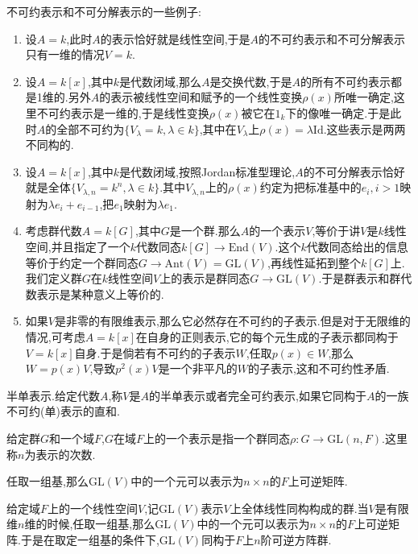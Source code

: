 不可约表示和不可分解表示的一些例子:
\begin{enumerate}
	\item 设$A=k$,此时$A$的表示恰好就是线性空间,于是$A$的不可约表示和不可分解表示只有一维的情况$V=k$.
	\item 设$A=k[x]$,其中$k$是代数闭域,那么$A$是交换代数,于是$A$的所有不可约表示都是1维的.另外$A$的表示被线性空间和赋予的一个线性变换$\rho(x)$所唯一确定,这里不可约表示是一维的,于是线性变换$\rho(x)$被它在$1_k$下的像唯一确定.于是此时$A$的全部不可约为$\{V_{\lambda}=k,\lambda\in k\}$,其中在$V_{\lambda}$上$\rho(x)=\lambda\mathrm{Id}$.这些表示是两两不同构的.
	\item 设$A=k[x]$,其中$k$是代数闭域,按照Jordan标准型理论,$A$的不可分解表示恰好就是全体$\{V_{\lambda,n}=k^n,\lambda\in k\}$.其中$V_{\lambda,n}$上的$\rho(x)$约定为把标准基中的$e_i,i>1$映射为$\lambda e_i+e_{i-1}$,把$e_1$映射为$\lambda e_1$.
	\item 考虑群代数$A=k[G]$,其中$G$是一个群.那么$A$的一个表示$V$,等价于讲$V$是$k$线性空间,并且指定了一个$k$代数同态$k[G]\to\mathrm{End}(V)$.这个$k$代数同态给出的信息等价于约定一个群同态$G\to\mathrm{Ant}(V)=\mathrm{GL}(V)$,再线性延拓到整个$k[G]$上.我们定义群$G$在$k$线性空间$V$上的表示是群同态$G\to\mathrm{GL}(V)$.于是群表示和群代数表示是某种意义上等价的.
	\item 如果$V$是非零的有限维表示,那么它必然存在不可约的子表示.但是对于无限维的情况,可考虑$A=k[x]$在自身的正则表示,它的每个元生成的子表示都同构于$V=k[x]$自身.于是倘若有不可约的子表示$W$,任取$p(x)\in W$,那么$W=p(x)V$,导致$p^2(x)V$是一个非平凡的$W$的子表示,这和不可约性矛盾.
\end{enumerate}

半单表示.给定代数$A$,称$V$是$A$的半单表示或者完全可约表示,如果它同构于$A$的一族不可约(单)表示的直和.












给定群$G$和一个域$F$,$G$在域$F$上的一个表示是指一个群同态$\rho:G\to\mathrm{GL}(n,F)$.这里称$n$为表示的次数.



任取一组基,那么$\mathrm{GL}(V)$中的一个元可以表示为$n\times n$的$F$上可逆矩阵.


给定域$F$上的一个线性空间$V$,记$\mathrm{GL}(V)$表示$V$上全体线性同构构成的群.当$V$是有限维$n$维的时候,任取一组基,那么$\mathrm{GL}(V)$中的一个元可以表示为$n\times n$的$F$上可逆矩阵.于是在取定一组基的条件下,$\mathrm{GL}(V)$同构于$F$上$n$阶可逆方阵群.

